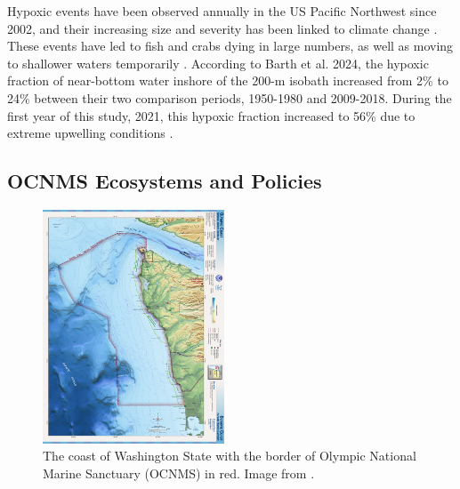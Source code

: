 \documentclass[12pt,twoside]{reedthesis}
\begin{document}
{Hypoxic events have been observed annually in the US Pacific Northwest since 2002, and their increasing size and severity has been linked to climate change \autocite{Bograd2023, Parks2009}. These events have led to fish and crabs dying in large numbers, as well as moving to shallower waters temporarily \autocite{Grantham2004}. According to Barth et al. 2024, the hypoxic fraction of near-bottom water inshore of the 200-m isobath increased from 2\% to 24\% between their two comparison periods, 1950-1980 and 2009-2018. During the first year of this study, 2021, this hypoxic fraction increased to 56\% due to extreme upwelling conditions \autocite{Barth2024}. 

\subsection{OCNMS Ecosystems and Policies}

\begin{figure}
	\begin{center}
		\includegraphics[width=0.48\textwidth]{Fig_OCNMS_Map}
		\caption[Map of OCNMS]{\footnotesize{The coast of Washington State with the border of Olympic National Marine Sanctuary (OCNMS) in red. Image from .}} %
		\label{OCNMSMap}
	\end{center}
\end{figure} 

}
\end{document}
